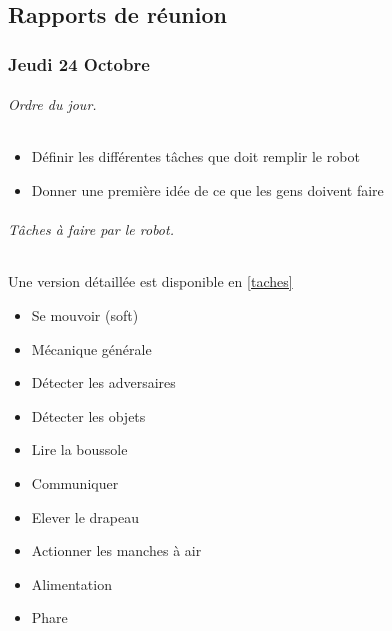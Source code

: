 \documentclass[a4paper,10pt]{report}
\theoremstyle{definition}
\begin{document}
\begin{spacing}{1.5}
\part{Rapports de réunion}
\pagestyle{fancy}
\rhead{\thepage}
\lfoot{}
\cfoot{}
\rfoot{}

\section*{Jeudi 24 Octobre}
\paragraph*{Ordre du jour.}
\begin{itemize}
\item Définir les différentes tâches que doit remplir le robot
\item Donner une première idée de ce que les gens doivent faire
\end{itemize}
\begin{multicols}{2}
\paragraph*{Tâches à faire par le robot.}
Une version détaillée est disponible en \ref{taches}
\begin{itemize}
\item Se mouvoir (soft)
\item Mécanique générale
\item Détecter les adversaires
\item Détecter les objets
\item Lire la boussole
\item Communiquer
\item Elever le drapeau
\item Actionner les manches à air
\item Alimentation
\item Phare
\end{itemize}
\columnbreak

\end{multicols}
\end{spacing}
\end{document}
